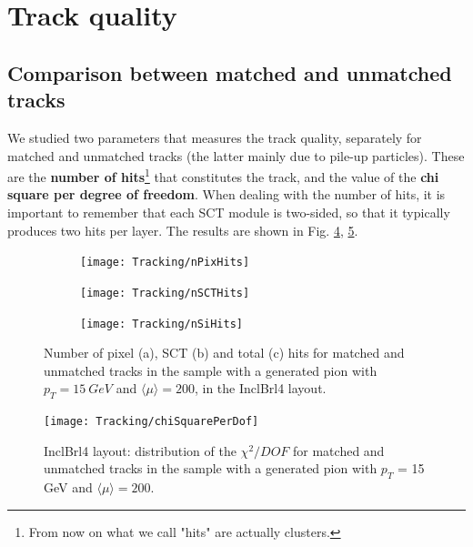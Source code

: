 \documentclass[a4paper,twoside,12pt]{book}
\begin{document}
\section{Track quality}\label{subsec:tracking:quality}

\subsection{Comparison between matched and unmatched tracks}

We studied two parameters that measures the track quality, separately for matched and unmatched tracks (the latter mainly due to pile-up particles). These
are the \textbf{number of hits}\footnote{From now on what we call "hits" are actually clusters.} that constitutes the track, and the value of the \textbf{chi square per degree of freedom}. When dealing with the number
of hits, it is important to remember that each SCT module is two-sided, so that it typically produces two hits per layer. The results are shown in Fig. \ref{fig:tracking:nHits}, \ref{fig:tracking:chiSquare}. \\

\begin{figure}
\begin{subfigure}{\linewidth}
\centering
\texttt{[image: Tracking/nPixHits]}
\caption{}
\label{fig:tracking:nPixHits}
\end{subfigure}

\begin{subfigure}{\linewidth}
\centering
\texttt{[image: Tracking/nSCTHits]}
\caption{}
\label{fig:tracking:nSCTHits}
\end{subfigure}

\begin{subfigure}{\linewidth}
\centering
\texttt{[image: Tracking/nSiHits]}
\caption{}
\label{fig:tracking:nSiHits}
\end{subfigure}
\caption{Number of pixel (a), SCT (b) and total (c) hits for matched and unmatched tracks in the sample with a generated pion with $p_{T} = 15\ GeV$ and $\langle\mu\rangle = 200$, in the InclBrl4 layout.}
\label{fig:tracking:nHits}
\end{figure}

\begin{figure}
\centering
\texttt{[image: Tracking/chiSquarePerDof]}
\caption{InclBrl4 layout: distribution of the $\chi^2/DOF$ for matched and unmatched tracks in the sample with a generated pion with $p_{T}$ = 15 GeV and $\langle\mu\rangle = 200$.}
\label{fig:tracking:chiSquare}
\end{figure}
\end{document}
